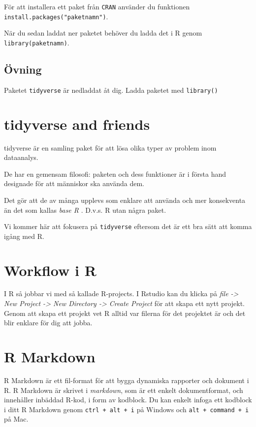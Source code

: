 \documentclass[
]{book}
\begin{document}
För att installera ett paket från \texttt{CRAN} använder du funktionen \texttt{install.packages("paketnamn")}.

När du sedan laddat ner paketet behöver du ladda det i R genom \texttt{library(paketnamn)}.

\hypertarget{uxf6vning-1}{%
\subsection{Övning}\label{uxf6vning-1}}

Paketet \texttt{tidyverse} är nedladdat åt dig. Ladda paketet med \texttt{library()}

\hypertarget{tidyverse-and-friends}{%
\section{tidyverse and friends}\label{tidyverse-and-friends}}

tidyverse är en samling paket för att lösa olika typer av problem inom dataanalys.

De har en gemensam filosofi: paketen och dess funktioner är i första hand designade för att människor ska använda dem.

Det gör att de av många upplevs som enklare att använda och mer konsekventa än det som kallas \emph{base R} . D.v.s. R utan några paket.

Vi kommer här att fokusera på \texttt{tidyverse} eftersom det är ett bra sätt att komma igång med R.

\hypertarget{workflow-i-r}{%
\section{Workflow i R}\label{workflow-i-r}}

I R så jobbar vi med så kallade R-projects. I Rstudio kan du klicka på \emph{file -\textgreater{} New Project -\textgreater{} New Directory -\textgreater{} Create Project} för att skapa ett nytt projekt. Genom att skapa ett projekt vet R alltid var filerna för det projektet är och det blir enklare för dig att jobba.

\hypertarget{r-markdown}{%
\section{R Markdown}\label{r-markdown}}

R Markdown är ett fil-format för att bygga dynamiska rapporter och dokument i R. R Markdown är skrivet i \emph{markdown}, som är ett enkelt dokumentformat, och innehåller inbäddad R-kod, i form av kodblock. Du kan enkelt infoga ett kodblock i ditt R Markdown genom \texttt{ctrl\ +\ alt\ +\ i} på Windows och \texttt{alt\ +\ command\ +\ i} på Mac.
\end{document}
